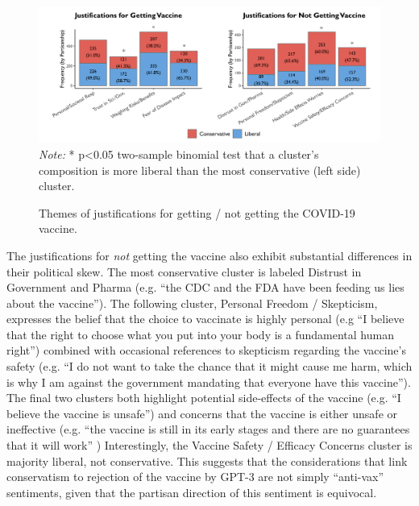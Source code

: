\documentclass{article}
\begin{document}
\begin{figure}[H]
  \captionsetup{justification=raggedright,singlelinecheck=false}
  \caption{Themes of justifications for getting / not getting
  the COVID-19 vaccine.}
  \label{fig:partisan5}
  \centering
  \includegraphics[width=\textwidth]{./figures/media/image4.png}
  \smallskip 
  \small 
  \\ \textit{Note:} * p\textless0.05 two-sample binomial test that a cluster's composition is more liberal than the most conservative (left side) cluster. 
\end{figure}

The justifications for \emph{not} getting the vaccine also exhibit
substantial differences in their political skew. The most conservative
cluster is labeled Distrust in Government and Pharma (e.g. ``the CDC and
the FDA have been feeding us lies about the vaccine''). The following
cluster, Personal Freedom / Skepticism, expresses the belief that the
choice to vaccinate is highly personal (e.g ``I believe that the right
to choose what you put into your body is a fundamental human right'')
combined with occasional references to skepticism regarding the
vaccine's safety (e.g. ``I do not want to take the chance that it might
cause me harm, which is why I am against the government mandating that
everyone have this vaccine''). The final two clusters both highlight
potential side-effects of the vaccine (e.g. ``I believe the vaccine is
unsafe'') and concerns that the vaccine is either unsafe or ineffective
(e.g. ``the vaccine is still in its early stages and there are no
guarantees that it will work'' ) Interestingly, the Vaccine Safety /
Efficacy Concerns cluster is majority liberal, not conservative. This
suggests that the considerations that link conservatism to rejection of
the vaccine by GPT-3 are not simply ``anti-vax'' sentiments, given that
the partisan direction of this sentiment is equivocal.
\end{document}
